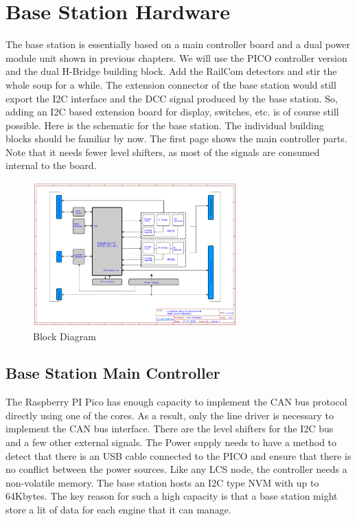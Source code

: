 \chapter{Base Station Hardware}

The base station is essentially based on a main controller board and a dual power module unit shown in previous chapters. We will use the PICO controller version and the dual H-Bridge building block. Add the RailCom detectors and stir the whole soup for a while. The extension connector of the base station would still export the I2C interface and the DCC signal produced by the base station. So, adding an I2C based extension board for display, switches, etc. is of course still possible. Here is the schematic for the base station. The individual building blocks should be familiar by now. The first page shows the main controller parts. Note that it needs fewer level shifters, as most of the signals are consumed internal to the board.

\begin{figure}[htbp]
    \centering
    \includegraphics[page=1, width=0.7\textwidth]{./Schematics/Schematic_LcsNodes-Base-Station-Board.pdf}
    \caption{Block Diagram}
\end{figure}
\FloatBarrier

\section{Base Station Main Controller}

The Raspberry PI Pico has enough capacity to implement the CAN bus protocol directly using one of the cores. As a result, only the line driver is necessary to implement the CAN bus interface. There are the level shifters for the I2C bus and a few other external signals. The Power supply needs to have a method to detect that there is an USB cable connected to the PICO and ensure that there is no conflict between the power sources. Like any LCS node, the controller needs a non-volatile memory. The base station hosts an I2C type NVM with up to 64Kbytes. The key reason for such a high capacity is that a base station might store a lit of data for each engine that it can manage.

